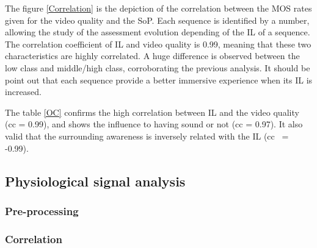 The figure \ref{Correlation} is the depiction of the correlation between the \ac{MOS} rates given for the video quality and the \ac{SoP}. Each sequence is identified by a number, allowing the study of the assessment evolution depending of the \ac{IL} of a sequence.
The correlation coefficient of \ac{IL} and video quality is 0.99, meaning that these two characteristics are highly correlated. A huge difference is observed between the low class and middle/high class, corroborating the previous analysis. It should be point out that each sequence provide a better immersive experience when its \ac{IL} is increased.


\begin{table}[h]
\end{table}

The table \ref{OC} confirms the high correlation between \ac{IL} and the video quality (cc = 0.99), and shows the influence to having sound or not (cc = 0.97). It also valid that the surrounding awareness is inversely related with the \ac{IL} (cc ~= -0.99).

\subsection{Physiological signal analysis}

\subsubsection{Pre-processing}

\subsubsection{Correlation}